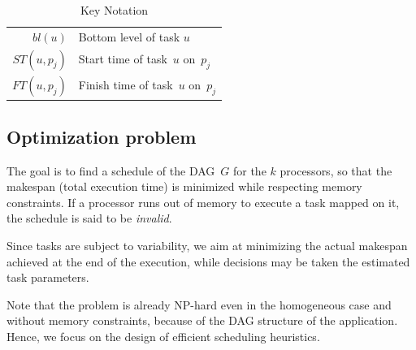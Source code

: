 \documentclass[conference]{IEEEtran}
\newcommand{\hmey}[1]{{\color{red}[HM: #1]}}
\begin{document}
\begin{table}
\begin{center}
\begin{tabular}{rl}
                $bl(u)$                      & Bottom level of task $u$ \\
                $ST(u,p_j)$	 & Start time of task~$u$ on~$p_j$ \\
               $FT(u,p_j)$	 & Finish time of task~$u$ on~$p_j$ \\
                \hline
            \end{tabular}
        \end{center}
        \caption{Key Notation} \label{tabnotation}
    \end{table}



\subsection{Optimization problem}
\label{sec.mod.pb}

The goal is to find a schedule of the DAG~$G$ for the $k$ processors,
so that the makespan (total execution time) is minimized while
respecting memory constraints. If a processor runs out of memory to execute
a task mapped on it, the schedule is said to be {\em invalid}.

Since tasks are subject to variability, we aim at minimizing the actual makespan
achieved at the end of the execution, while decisions may be taken \wrt 
the estimated task parameters.

Note that the problem is already NP-hard even in the homogeneous case and 
without memory constraints, because of the DAG structure of the application. 
Hence, we focus on the design of efficient scheduling heuristics. 
\end{document}
